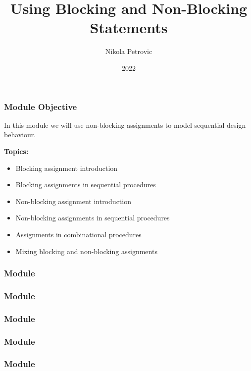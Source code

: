 \documentclass[t, notes, xcolor=table]{beamer}
\title{Using Blocking and Non-Blocking Statements}
\author{Nikola Petrovic}
\institute{University of Belgrade, School of Electrical Engineering}
\date{2022}
\begin{document}
\frame{\titlepage}

\begin{frame}
\frametitle{Module Objective}

In this module we will use non-blocking assignments to model sequential design behaviour.
\newline

\textbf{Topics:}
\begin{itemize}
\item Blocking assignment introduction
\item Blocking assignments in sequential procedures
\item Non-blocking assignment introduction
\item Non-blocking assignments in sequential procedures
\item Assignments in combinational procedures
\item Mixing blocking and non-blocking assignments
\end{itemize}

\end{frame}

\begin{frame}
\frametitle{Module}

\end{frame}

\begin{frame}
\frametitle{Module}

\end{frame}

\begin{frame}
\frametitle{Module}

\end{frame}

\begin{frame}
\frametitle{Module}

\end{frame}

\begin{frame}
\frametitle{Module}

\end{frame}
\end{document}

